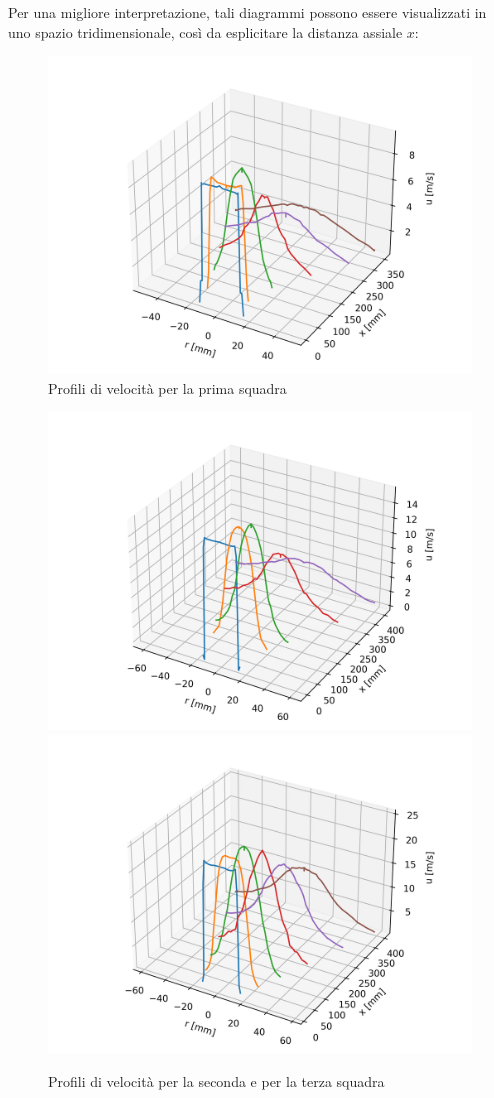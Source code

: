 \noindent Per una migliore interpretazione, tali diagrammi possono essere visualizzati in uno spazio tridimensionale, così da esplicitare la distanza assiale $x$:
\begin{figure}[H]
    \centering
    \includegraphics[width=.8\textwidth]{images/3/sq13d.png}
    \caption{Profili di velocità per la prima squadra}
\end{figure}
\begin{figure}[H]
    \centering
    \includegraphics[width=.92\textwidth]{images/3/sq23d.png}
    \includegraphics[width=.92\textwidth]{images/3/sq33d.png}
    \caption{Profili di velocità per la seconda e per la terza squadra}
\end{figure}
